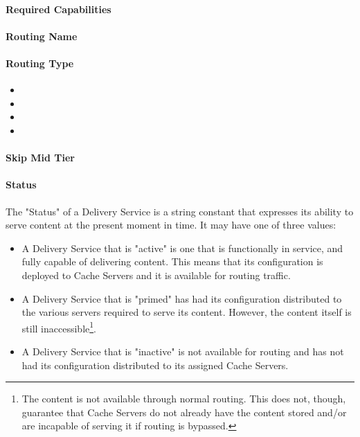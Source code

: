 
\paragraph{Required Capabilities}

\paragraph{Routing Name}

\paragraph{Routing Type}
\begin{itemize}
	\item {}
	\item {}
	\item {}
	\item {}
\end{itemize}

\paragraph{Skip Mid Tier}

\paragraph{Status}
The "Status" of a Delivery Service is a string constant that expresses its
ability to serve content at the present moment in time. It may have one of three
values:

\begin{itemize}
	\item {} A Delivery Service that is "active" is one that is
	functionally in service, and fully capable of delivering content. This means
	that its configuration is deployed to Cache Servers and it is available for
	routing traffic.
	\item {} A Delivery Service that is "primed" has had its
	configuration distributed to the various servers required to serve its
	content. However, the content itself is still inaccessible\footnote{The
	content is not available through normal routing. This does not, though,
	guarantee that Cache Servers do not already have the content stored and/or
	are incapable of serving it if routing is bypassed.}.
	\item {} A Delivery Service that is "inactive" is not available
	for routing and has not had its configuration distributed to its assigned
	Cache Servers.
\end{itemize}

